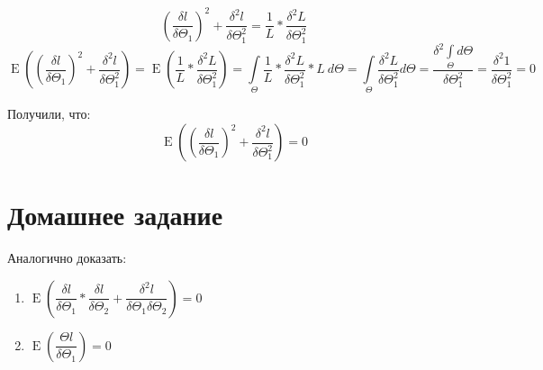 \documentclass[12pt]{article} %
\theoremstyle{definition} %
\DeclareMathOperator{\E}{E}
\begin{document}
$$\left(\dfrac{\delta l}{\delta \Theta_1}\right)^2 + \dfrac{\delta^2l}{\delta \Theta_1^2} = \dfrac{1}{L}*\dfrac{\delta^2L}{\delta \Theta_1^2}$$
$$\E\left(\left(\dfrac{\delta l}{\delta \Theta_1}\right)^2 + \dfrac{\delta^2l}{\delta \Theta_1^2}\right) = \E\left(\dfrac{1}{L}*\dfrac{\delta^2L}{\delta \Theta_1^2}\right) = \int\limits_\Theta \dfrac{1}{L}*\dfrac{\delta^2 L}{\delta \Theta_1^2}*L ~d\Theta = \int\limits_\Theta \dfrac{\delta^2 L}{\delta \Theta_1^2} d\Theta = \dfrac{\delta^2 \int\limits_\Theta d\Theta}{\delta \Theta_1^2} = \dfrac{\delta^2 1}{\delta \Theta_1^2} = 0$$

Получили, что:
$$\E\left(\left(\dfrac{\delta l}{\delta \Theta_1}\right)^2 + \dfrac{\delta^2l}{\delta \Theta_1^2}\right) = 0$$

\section*{Домашнее задание}
Аналогично доказать:
\begin{enumerate}
    \item $\E\left(\dfrac{\delta l}{\delta \Theta_1}*\dfrac{\delta l}{\delta \Theta_2} + \dfrac{\delta^2 l}{\delta \Theta_1 \delta \Theta_2}\right) = 0$
    \item $\E\left(\dfrac{\Theta l}{\delta \Theta_1}\right) = 0$
\end{enumerate}
\end{document}
